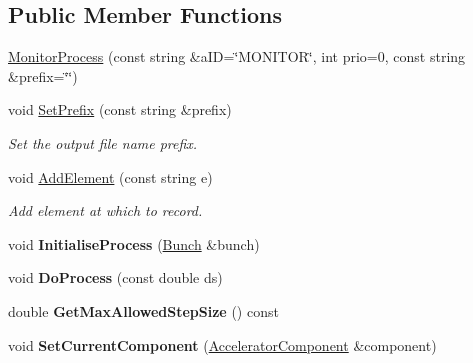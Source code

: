 \subsection*{Public Member Functions}
\begin{DoxyCompactItemize}
\item 
\hyperlink{classParticleTracking_1_1MonitorProcess_a666c203e1393e207f65e89d6a1a5d231}{Monitor\+Process} (const string \&a\+ID=\char`\"{}M\+O\+N\+I\+T\+OR\char`\"{}, int prio=0, const string \&prefix=\char`\"{}\char`\"{})
\item 
\mbox{\label{classParticleTracking_1_1MonitorProcess_a5eee229385d9bd491fd8fc78f02ac4bf}} 
void \hyperlink{classParticleTracking_1_1MonitorProcess_a5eee229385d9bd491fd8fc78f02ac4bf}{Set\+Prefix} (const string \&prefix)
\begin{DoxyCompactList}\small\item\em Set the output file name prefix. \end{DoxyCompactList}\item 
\mbox{\label{classParticleTracking_1_1MonitorProcess_abbc8579ca8f14f0d9a795dc5fe7e664f}} 
void \hyperlink{classParticleTracking_1_1MonitorProcess_abbc8579ca8f14f0d9a795dc5fe7e664f}{Add\+Element} (const string e)
\begin{DoxyCompactList}\small\item\em Add element at which to record. \end{DoxyCompactList}\item 
\mbox{\label{classParticleTracking_1_1MonitorProcess_a67766a1c348ec6cd8adb95ee8e7024bb}} 
void {\bfseries Initialise\+Process} (\hyperlink{classBunch}{Bunch} \&bunch)
\item 
\mbox{\label{classParticleTracking_1_1MonitorProcess_a21fedd0f57d6fc91ee86f826c3555ddf}} 
void {\bfseries Do\+Process} (const double ds)
\item 
\mbox{\label{classParticleTracking_1_1MonitorProcess_aae5bb4721521effd76a91a00d6a610dd}} 
double {\bfseries Get\+Max\+Allowed\+Step\+Size} () const
\item 
\mbox{\label{classParticleTracking_1_1MonitorProcess_aaec27ae366e78b3cdfc8484f96398df8}} 
void {\bfseries Set\+Current\+Component} (\hyperlink{classAcceleratorComponent}{Accelerator\+Component} \&component)
\end{DoxyCompactItemize}
